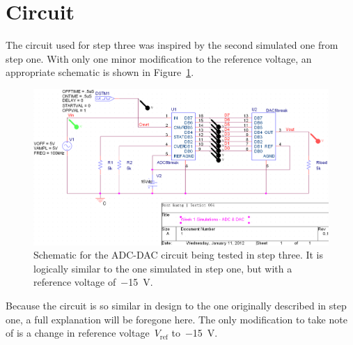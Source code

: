 \section{Circuit}

The circuit used for step three was inspired by the second simulated one from
step one.  With only one minor modification to the reference voltage, an
appropriate schematic is shown in Figure~\ref{f:schem}.
%
\begin{figure}[H]
\centering
	\includegraphics[width=.8\textwidth]{img/shot/schem.png}
	\parbox{.8\textwidth}{
	\caption[ADC-DAC Schematic]{Schematic for the ADC-DAC circuit being tested
	in step three.  It is logically similar to the one simulated in step one,
	but with a reference voltage of~\SI{-15}{\volt}.}
	\label{f:schem}}
\end{figure}
%
Because the circuit is so similar in design to the one originally described in
step one, a full explanation will be foregone here.  The only modification to
take note of is a change in reference voltage~$V_\text{ref}$
to~\SI{-15}{\volt}.
